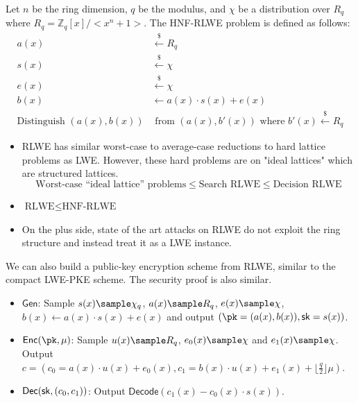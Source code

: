 \documentclass[12pt]{tufte-book}
\newcommand{\getsr}{\xleftarrow{\$}}
\newcommand{\Gen}{\mathsf{Gen}}
\newcommand{\Enc}{\mathsf{Enc}}
\newcommand{\Dec}{\mathsf{Dec}}
\begin{document}
\begin{definition}
    Let $n$ be the ring dimension, $q$ be the modulus, and $\chi$ be a distribution over $R_q$ where $R_q = \mathbb{Z}_q[x]/<x^n + 1>$. The HNF-RLWE problem is defined as follows:  
    \begin{align*}
        a(x) &\getsr R_q \\
        s(x) &\getsr \chi \\
        e(x) &\getsr \chi \\
        b(x) &\gets a(x) \cdot s(x) + e(x) \\
        \text{Distinguish } (a(x), b(x)) &\text{ from } (a(x), b'(x)) \text{ where } b'(x) \getsr R_q 
    \end{align*}
\end{definition}
\begin{itemize}
    \item RLWE has similar worst-case to average-case reductions to hard lattice problems as LWE. However, these hard problems are on "ideal lattices" which are structured lattices. 
    $$\text{Worst-case ``ideal lattice'' problems} \leq \text{Search RLWE} \leq \text{Decision RLWE}$$

    \item $\text{RLWE} \leq \text{HNF-RLWE}$
    \item On the plus side, state of the art attacks on RLWE do not exploit the ring structure and instead treat it as a LWE instance.
\end{itemize}

We can also build a public-key encryption scheme from RLWE, similar to the compact LWE-PKE scheme. The security proof is also similar.
\begin{construction}
    \hfill
    \begin{itemize}
        \item $\Gen$: Sample $s(x) \sample \chi_q$, $a(x) \sample R_q$, $e(x) \sample \chi$, $b(x) \gets a(x) \cdot s(x) + e(x)$ and output $(\pk = (a(x),b(x)), \sk = s(x))$.
        \item $\Enc(\pk, \mu)$: Sample $u(x) \sample R_q$, $e_0(x) \sample \chi$ and $e_1(x) \sample \chi$. Output $c = (c_0 = a(x) \cdot u(x) + e_0(x),c_1 =  b(x) \cdot u(x) + e_1(x) + \lfloor\frac{q}{2}\rfloor\mu)$.
        \item $\Dec(\sk, (c_0,c_1))$: Output $\mathsf{Decode}(c_1(x) - c_0(x) \cdot s(x))$.
    \end{itemize}
\end{construction}
\end{document}
